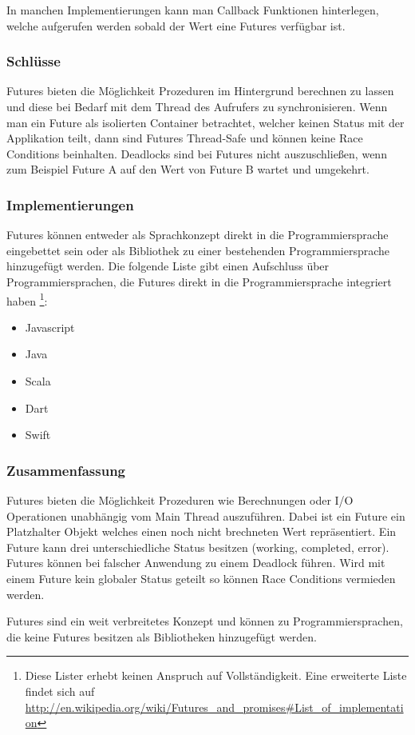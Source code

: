 In manchen Implementierungen kann man Callback Funktionen hinterlegen, welche aufgerufen werden sobald der Wert eine Futures verfügbar ist. 

\subsubsection{Schlüsse}
Futures bieten die Möglichkeit Prozeduren im Hintergrund berechnen zu lassen und diese bei Bedarf mit dem Thread des Aufrufers zu synchronisieren. Wenn man ein Future als isolierten Container betrachtet, welcher keinen Status mit der Applikation teilt, dann sind Futures Thread-Safe und können keine Race Conditions beinhalten. Deadlocks sind bei Futures nicht auszuschließen, wenn zum Beispiel Future A auf den Wert von Future B wartet und umgekehrt.

\subsubsection{Implementierungen}
Futures können entweder als Sprachkonzept direkt in die Programmiersprache eingebettet sein oder als Bibliothek zu einer bestehenden Programmiersprache hinzugefügt werden. Die folgende Liste gibt einen Aufschluss über Programmiersprachen, die Futures direkt in die Programmiersprache integriert haben \footnote{Diese Lister erhebt keinen Anspruch auf Vollständigkeit. Eine erweiterte Liste findet sich auf \url{http://en.wikipedia.org/wiki/Futures_and_promises#List_of_implementation}}:

\begin{itemize}
  \item Javascript
  \item Java
  \item Scala
  \item Dart
  \item Swift
\end{itemize}  

\subsubsection{Zusammenfassung}
Futures bieten die Möglichkeit Prozeduren wie Berechnungen oder I/O Operationen unabhängig vom Main Thread auszuführen. Dabei ist ein Future ein Platzhalter Objekt welches einen noch nicht brechneten Wert repräsentiert. Ein Future kann drei unterschiedliche Status besitzen (working, completed, error). Futures können bei falscher Anwendung zu einem Deadlock führen. Wird mit einem Future kein globaler Status geteilt so können Race Conditions vermieden werden. 

Futures sind ein weit verbreitetes Konzept und können zu Programmiersprachen, die keine Futures besitzen als Bibliotheken hinzugefügt werden.